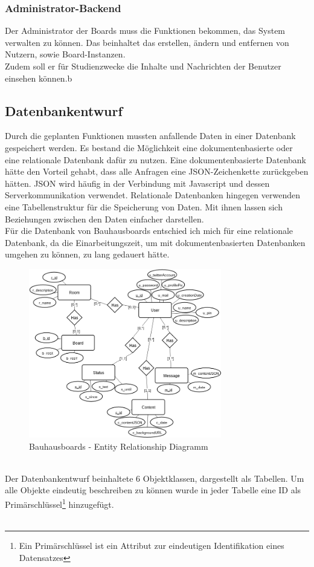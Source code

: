 \subsubsection{Administrator-Backend}\label{Administrator-Backend}
Der Administrator der Boards muss die Funktionen bekommen, das System verwalten zu können. Das beinhaltet das erstellen, ändern und entfernen von Nutzern, sowie Board-Instanzen.
\\
Zudem soll er für Studienzwecke die Inhalte und Nachrichten der Benutzer einsehen können.b

\subsection{Datenbankentwurf}\label{Datenbankentwurf}
Durch die geplanten Funktionen mussten anfallende Daten in einer Datenbank gespeichert werden.
Es bestand die Möglichkeit eine dokumentenbasierte oder eine relationale Datenbank dafür zu nutzen.
Eine dokumentenbasierte Datenbank hätte den Vorteil gehabt, dass alle Anfragen eine JSON-Zeichenkette zurückgeben hätten. JSON wird häufig in der Verbindung mit Javascript und dessen Serverkommunikation verwendet.
Relationale Datenbanken hingegen verwenden eine Tabellenstruktur für die Speicherung von Daten. Mit ihnen lassen sich Beziehungen zwischen den Daten einfacher darstellen.
\\
Für die Datenbank von Bauhausboards entschied ich mich für eine relationale Datenbank, da die Einarbeitungszeit, um mit dokumentenbasierten Datenbanken umgehen zu können, zu lang gedauert hätte.
\begin{figure}[h!]
  \centering
    \includegraphics[width=0.75\textwidth]{./img/ER01.png}
  \caption{Bauhausboards - Entity Relationship Diagramm}
  \label{img:ER01}
\end{figure}
\\
Der Datenbankentwurf beinhaltete 6 Objektklassen, dargestellt als Tabellen. Um alle Objekte eindeutig beschreiben zu können wurde in jeder Tabelle eine ID als Primärschlüssel\footnote{Ein Primärschlüssel ist ein Attribut zur eindeutigen Identifikation eines Datensatzes} hinzugefügt.
\\\\

